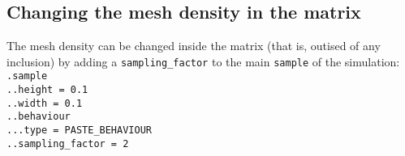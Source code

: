 \documentclass[10pt]{article}
\begin{document}
\subsection{Changing the mesh density in the matrix}

The mesh density can be changed inside the matrix (that is, outised of any inclusion) by adding a \verb+sampling_factor+ to the main \verb+sample+ of the simulation:\\

\noindent \verb+.sample+\\
\verb+..height = 0.1+\\
\verb+..width = 0.1+\\
\verb+..behaviour+\\
\verb+...type = PASTE_BEHAVIOUR+\\
\verb+..sampling_factor = 2+



\end{document}
